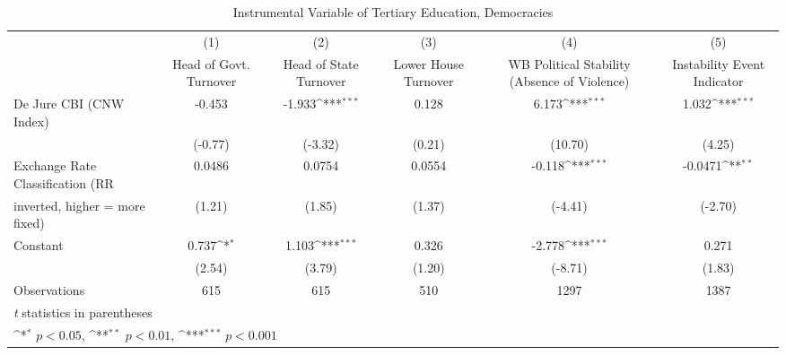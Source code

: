 \begin{table}[htbp]\centering
\def\sym#1{\ifmmode^{#1}\else\(^{#1}\)\fi}
\caption{Instrumental Variable of Tertiary Education, Democracies \label{demIfivs}}
\begin{tabular}{l*{5}{c}}
\toprule
                                        &\multicolumn{1}{c}{(1)}&\multicolumn{1}{c}{(2)}&\multicolumn{1}{c}{(3)}&\multicolumn{1}{c}{(4)}&\multicolumn{1}{c}{(5)}\\
                                        &\multicolumn{1}{c}{Head of Govt. Turnover}&\multicolumn{1}{c}{Head of State Turnover}&\multicolumn{1}{c}{Lower House Turnover}&\multicolumn{1}{c}{WB Political Stability (Absence of Violence)}&\multicolumn{1}{c}{Instability Event Indicator}\\
\midrule
De Jure CBI (CNW Index)                 &   -0.453         &   -1.933\sym{***}&    0.128         &    6.173\sym{***}&    1.032\sym{***}\\
                                        &  (-0.77)         &  (-3.32)         &   (0.21)         &  (10.70)         &   (4.25)         \\
\addlinespace
Exchange Rate Classification (RR        &   0.0486         &   0.0754         &   0.0554         &   -0.118\sym{***}&  -0.0471\sym{**} \\
inverted, higher = more fixed)          &   (1.21)         &   (1.85)         &   (1.37)         &  (-4.41)         &  (-2.70)         \\
\addlinespace
Constant                                &    0.737\sym{*}  &    1.103\sym{***}&    0.326         &   -2.778\sym{***}&    0.271         \\
                                        &   (2.54)         &   (3.79)         &   (1.20)         &  (-8.71)         &   (1.83)         \\
\midrule
Observations                            &      615         &      615         &      510         &     1297         &     1387         \\
\bottomrule
\multicolumn{6}{l}{\footnotesize \textit{t} statistics in parentheses}\\
\multicolumn{6}{l}{\footnotesize \sym{*} \(p<0.05\), \sym{**} \(p<0.01\), \sym{***} \(p<0.001\)}\\
\end{tabular}
\end{table}
